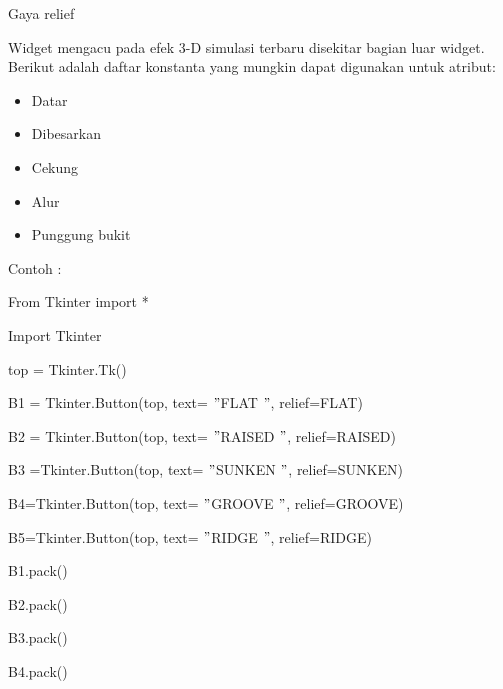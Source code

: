 \documentclass{wileySix}
\begin{document}
\begin{myEnumerate}
{\begin{myEnumerate}
	\noindent 
	\item Gaya relief \par
	\noindent 
	Widget mengacu pada efek 3-D simulasi terbaru disekitar bagian luar widget. Berikut adalah daftar konstanta yang mungkin dapat digunakan untuk atribut: \par
	\noindent 
	\begin{itemize}
		\item Datar \par
		\noindent 
		\item Dibesarkan \par
		\noindent 
		\item Cekung \par
		\noindent 
		\item Alur \par
		\noindent 
		\item Punggung bukit\end{itemize}
	\par
	\vspace{12pt}
	Contoh : \par
	{\fontsize{10pt}{10pt}\selectfont From Tkinter import *} \par
	{\fontsize{10pt}{10pt}\selectfont Import Tkinter} \par
	\vspace{10pt}
	{\fontsize{10pt}{10pt}\selectfont top = Tkinter.Tk()} \par
	{\fontsize{10pt}{10pt}\selectfont B1 = Tkinter.Button(top, text= $ " $FLAT $ " $, relief=FLAT)} \par
	{\fontsize{10pt}{10pt}\selectfont B2 = Tkinter.Button(top, text= $ " $RAISED $ " $, relief=RAISED)} \par
	{\fontsize{10pt}{10pt}\selectfont B3 =Tkinter.Button(top, text= $ " $SUNKEN $ " $, relief=SUNKEN)} \par
	{\fontsize{10pt}{10pt}\selectfont B4=Tkinter.Button(top, text= $ " $GROOVE $ " $, relief=GROOVE)} \par
	{\fontsize{10pt}{10pt}\selectfont B5=Tkinter.Button(top, text= $ " $RIDGE $ " $, relief=RIDGE)} \par
	\vspace{10pt}
	{\fontsize{10pt}{10pt}\selectfont B1.pack()} \par
	{\fontsize{10pt}{10pt}\selectfont B2.pack()} \par
	{\fontsize{10pt}{10pt}\selectfont B3.pack()} \par
	{\fontsize{10pt}{10pt}\selectfont B4.pack()} \par

\end{myEnumerate}}
\end{myEnumerate}
\end{document}

